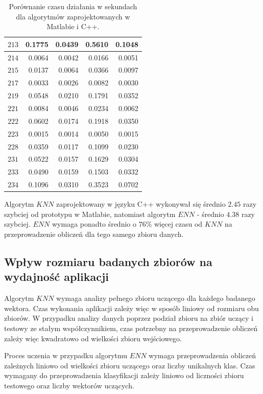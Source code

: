 \begin{table}[H]
\begin{tabular}{|c|r|r|r|r|}
\hline
$213$ & 0.1775 & 0.0439 & 0.5610 & 0.1048 \\
\hline
$214$ & 0.0064 & 0.0042 & 0.0166 & 0.0051 \\
\hline
$215$ & 0.0137 & 0.0064 & 0.0366 & 0.0097 \\
\hline
$217$ & 0.0033 & 0.0026 & 0.0082 & 0.0030 \\
\hline
$219$ & 0.0548 & 0.0210 & 0.1791 & 0.0352 \\
\hline
$221$ & 0.0084 & 0.0046 & 0.0234 & 0.0062 \\
\hline
$222$ & 0.0602 & 0.0174 & 0.1918 & 0.0350 \\
\hline
$223$ & 0.0015 & 0.0014 & 0.0050 & 0.0015 \\
\hline
$228$ & 0.0359 & 0.0117 & 0.1099 & 0.0230 \\
\hline
$231$ & 0.0522 & 0.0157 & 0.1629 & 0.0304 \\
\hline
$233$ & 0.0490 & 0.0159 & 0.1503 & 0.0332 \\
\hline
$234$ & 0.1096 & 0.0310 & 0.3523 & 0.0702 \\
\hline	
	\end{tabular}
	\caption{Porównanie czasu działania w sekundach dla algorytmów zaprojektowanych w Matlabie i C++.}
	\label{tab:matlab-vs-cpp-time}	
\end{table}
Algorytm $KNN$ zaprojektowany w języku C++ wykonywał się średnio $2.45$ razy szybciej od prototypu w Matlabie, natomiast algorytm $ENN$ - średnio $4.38$ razy szybciej. $ENN$ wymaga ponadto średnio o $76\%$ więcej czasu od $KNN$ na przeprowadzenie obliczeń dla tego samego zbioru danych.

\subsection{Wpływ rozmiaru badanych zbiorów na wydajność aplikacji}
Algorytm $KNN$ wymaga analizy pełnego zbioru uczącego dla każdego badanego wektora. Czas wykonania aplikacji zależy więc w sposób liniowy od rozmiaru obu zbiorów. W przypadku analizy danych poprzez podział zbioru na zbiór uczący i testowy ze stałym współczynnikiem, czas potrzebny na przeprowadzenie obliczeń zależy więc kwadratowo od wielkości zbioru wejściowego.

Proces uczenia w przypadku algorytmu $ENN$ wymaga przeprowadzenia obliczeń zależnych liniowo od wielkości zbioru uczącego oraz liczby unikalnych klas. Czas wymagany do przeprowadzenia klasyfikacji zależy liniowo od liczności zbioru testowego oraz liczby wektorów uczących.

